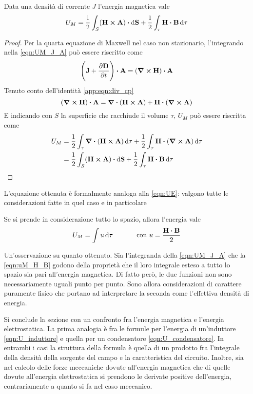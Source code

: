 \begin{thm}
    Data una densità di corrente $J$ l'energia magnetica vale
    \begin{equation}
        \label{eqn:UM}
        U_M=\rec{2} \int_{S} (\vb{H}\cp\vb{A}) \vdot \dd{\vb{S}} +\rec{2} \int_{\tau}\vb{H}\vdot\vb{B}\dd{\tau}
    \end{equation}
\end{thm}
\begin{proof}
    Per la quarta equazione di Maxwell nel caso non stazionario, l'integrando nella \eqref{eqn:UM_J_A} può essere riscritto come
    \[
        \Biggl(\vb{J}+\pdv{\vb{D}}{t}\Biggr)\vdot\vb{A}=(\curl{\vb{H}})\vdot\vb{A}
    \]
    Tenuto conto dell'identità \eqref{app:eqn:div_cp}
    \[
        (\curl{\vb{H}})\vdot\vb{A}=\div(\vb{H}\cp\vb{A})+\vb{H}\vdot(\curl{\vb{A}})
    \]
    E indicando con $S$ la superficie che racchiude il volume $\tau$, $U_M$ può essere riscritta come
    \[
        \begin{split}
            U_M&=\rec{2} \int_{\tau} \div(\vb{H}\cp\vb{A})\dd{\tau} +\rec{2} \int_{\tau}\vb{H}\vdot(\curl{\vb{A}})\dd{\tau}\\
            &=\rec{2} \int_{S} (\vb{H}\cp\vb{A}) \vdot \dd{\vb{S}} +\rec{2} \int_{\tau}\vb{H}\vdot\vb{B}\dd{\tau}
        \end{split}
    \]
\end{proof}
L'equazione ottenuta è formalmente analoga alla \eqref{eqn:UE}: valgono tutte le considerazioni fatte in quel caso
e in particolare
\begin{cor}
    Se si prende in considerazione tutto lo spazio, allora l'energia vale
    \begin{equation}
        \label{eqn:uM_H_B}
        U_M=\int u\dd{\tau} \quad\quad\quad \text{ con } u=\frac{\vb{H}\vdot\vb{B}}{2}
    \end{equation}
\end{cor}
Un'osservazione su quanto ottenuto. Sia l'integranda della \eqref{eqn:UM_J_A} che la \eqref{eqn:uM_H_B}
godono della proprietà che il loro integrale esteso a tutto lo spazio sia pari all'energia magnetica.
Di fatto però, le due funzioni non sono necessariamente uguali punto per punto. Sono allora considerazioni di carattere puramente fisico
che portano ad interpretare la seconda come l'effettiva densità di energia.

Si conclude la sezione con un confronto fra l'energia magnetica e l'energia elettrostatica.
La prima analogia è fra le formule per l'energia di un'induttore \eqref{eqn:U_induttore} e quella per un condensatore \eqref{eqn:U_condensatore}.
In entrambi i casi la struttura della formula è quella di un prodotto fra l'integrale della densità della sorgente del campo
e la caratteristica del circuito. Inoltre, sia nel calcolo delle forze meccaniche dovute all'energia magnetica che di quelle dovute
all'energia elettrostatica si prendono le derivate positive dell'energia, contrariamente a quanto si fa nel caso meccanico.
